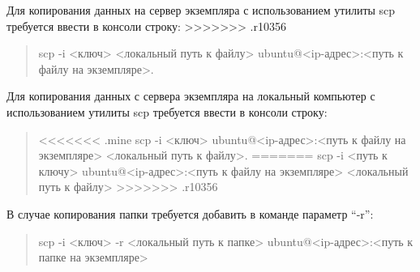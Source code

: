 \documentclass[12pt,twoside]{article}
\begin{document}
Для копирования данных на сервер экземпляра с использованием утилиты scp требуется ввести в консоли строку:
>>>>>>> .r10356
\begin{quote}
scp -i <ключ> <локальный путь к файлу> ubuntu@<ip-адрес>:<путь к файлу на экземпляре>.
\end{quote}
Для копирования данных с сервера экземпляра  на локальный компьютер с использованием утилиты scp требуется ввести в консоли строку:
\begin{quote}
<<<<<<< .mine
scp -i <ключ> ubuntu@<ip-адрес>:<путь к файлу на экземпляре>  <локальный путь к файлу>.
=======
scp -i <путь к ключу> ubuntu@<ip-адрес>:<путь к файлу на экземпляре>  <локальный путь к файлу> 
>>>>>>> .r10356
\end{quote}
В случае копирования папки требуется добавить в команде параметр ``-r'':
\begin{quote}
scp -i <ключ> -r <локальный путь к папке> ubuntu@<ip-адрес>:<путь к папке на экземпляре> 
\end{quote}
\end{document}
